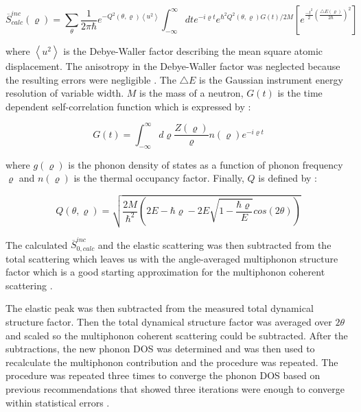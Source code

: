 \begin{equation}
\label{eq: td_dynstrufac}
\overline{S}_{calc}^{inc} (\varrho) = \sum_{\theta} \frac{1}{2 \pi \hbar} e^{- Q^{2} (\theta, \varrho) \left<u^{2} \right>} \int_{-\infty}^{\infty} dte^{-i \varrho t} e^{\hbar^{2}Q^{2}(\theta, \varrho) G(t)/2M} \left[ e^{\frac{-t^{2}}{2} \left(\frac{\bigtriangleup E (\varrho)}{2\hbar} \right)^{2}} \right]
\end{equation}

\noindent where $\left< u^{2} \right>$  is the Debye-Waller factor describing the mean square atomic displacement. The anisotropy in the Debye-Waller factor was neglected because the resulting errors were negligible \cite{Manley2001}. The $\bigtriangleup E$ is the Gaussian instrument energy resolution of variable width. $M$ is the mass of a neutron, $G(t)$ is the time dependent self-correlation function which is expressed by \cite{Manley2001}:

\begin{equation}
\label{eq: td_selfcorrelation}
G (t) = \int_{- \infty}^{\infty} d \varrho \frac{Z(\varrho)}{\varrho} n(\varrho) e^{- i \varrho t}
\end{equation}

\noindent where $g(\varrho)$ is the phonon density of states as a function of phonon frequency $\varrho$ and $n(\varrho)$ is the thermal occupancy factor. Finally, $Q$ is defined by \cite{Manley2001}:

\begin{equation}
\label{eq: Q}
Q(\theta, \varrho) = \sqrt{\frac{2M}{\hbar^{2}} \left( 2E - \hbar \varrho - 2E \sqrt{1-\frac{\hbar \varrho}{E}}cos(2\theta) \right)}
\end{equation}

\noindent The calculated $\overline{S}_{0,calc}^{inc}$ and the elastic scattering was then subtracted from the total scattering which leaves us with the angle-averaged multiphonon structure factor which is a good starting approximation for the multiphonon coherent scattering \cite{Manley2001}. 

The elastic peak was then subtracted from the measured total dynamical structure factor.  Then the total dynamical structure factor was averaged over $2\theta$ and scaled so the multiphonon coherent scattering could be subtracted. After the subtractions, the new phonon DOS was determined and was then used to recalculate the multiphonon contribution and the procedure was repeated. The procedure was repeated three times to converge the phonon DOS based on previous recommendations that showed three iterations were enough to converge within statistical errors \cite{Manley2001}.


